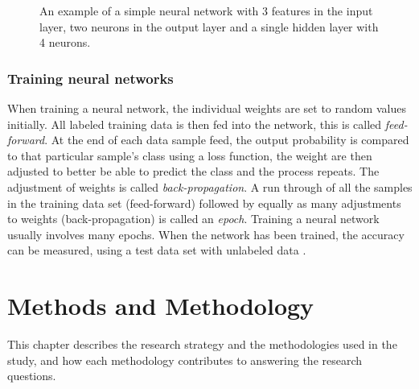 \documentclass[12pt, a4paper, onecolumn]{article}
\begin{document}
	\begin{figure}[H]
		\centering
		\caption{An example of a simple neural network with 3 features in the input layer, two neurons in the output layer and a single hidden layer with 4 neurons.}%
		\label{fig:neural-network-overview}%
	\end{figure} 
	
	\subsubsection{Training neural networks}
	When training a neural network, the individual weights are set to random values initially. All labeled training data is then fed into the network, this is called \textit{feed-forward}. At the end of each data sample feed, the output probability is compared to that particular sample's class using a loss function, the weight are then adjusted to better be able to predict the class and the process repeats. The adjustment of weights is called \textit{back-propagation}. A run through of all the samples in the training data set (feed-forward) followed by equally as many adjustments to weights (back-propagation) is called an \textit{epoch}. Training a neural network usually involves many epochs. When the network has been trained, the accuracy can be measured, using a test data set with unlabeled data \cite{neural_networks}.
	
	
	\newpage
	\section{Methods and Methodology} \label{section:methods}
	
	This chapter describes the research strategy and the methodologies used in the study, and how each methodology contributes to answering the research questions.
	
\end{document}
